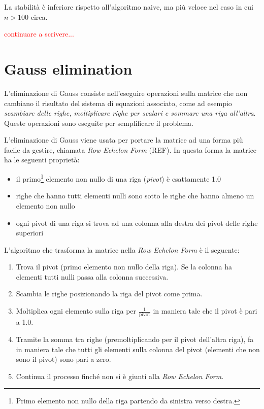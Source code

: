 \documentclass[10pt]{article}
\begin{document}
La stabilità è inferiore rispetto all'algoritmo naive, ma più veloce nel caso in cui $n>100$ circa.

\textcolor{red}{continuare a scrivere...}






\section{Gauss elimination}

L'eliminazione di Gauss consiste nell'eseguire operazioni sulla matrice che non cambiano il risultato del sistema di equazioni associato, come ad esempio \textit{scambiare delle righe, moltiplicare righe per scalari e sommare una riga all'altra}. Queste operazioni sono eseguite per semplificare il problema.

L'eliminazione di Gauss viene usata per portare la matrice ad una forma più facile da gestire, chiamata \textit{Row Echelon Form} (REF). In questa forma la matrice ha le seguenti proprietà:
\begin{itemize}[noitemsep]
\item il primo\footnote{Primo elemento non nullo della riga partendo da sinistra verso destra.} elemento non nullo di una riga (\emph{pivot}) è esattamente 1.0
\item righe che hanno tutti elementi nulli sono sotto le righe che hanno almeno un elemento non nullo
\item ogni pivot di una riga si trova ad una colonna alla destra dei pivot delle righe superiori
\end{itemize}
L'algoritmo che trasforma la matrice nella \textit{Row Echelon Form} è il seguente:
\begin{enumerate}[noitemsep]
\item Trova il pivot (primo elemento non nullo della riga). Se la colonna ha elementi tutti nulli passa alla colonna successiva.
\item Scambia le righe posizionando la riga del pivot come prima.
\item Moltiplica ogni elemento sulla riga per $\frac{1}{\text{pivot}}$ in maniera tale che il pivot è pari a 1.0.
\item Tramite la somma tra righe (premoltiplicando per il pivot dell'altra riga), fa in maniera tale che tutti gli elementi sulla colonna del pivot (elementi che non sono il pivot) sono pari a zero.
\item Continua il processo finché non si è giunti alla \textit{Row Echelon Form}.
\end{enumerate}
\end{document}
